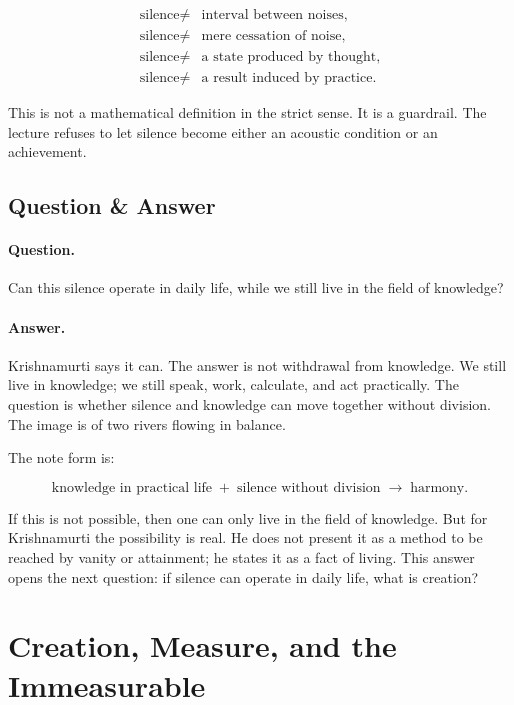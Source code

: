 \begin{align}
\text{silence} \neq{}&
\text{interval between noises}, \\
\text{silence} \neq{}&
\text{mere cessation of noise}, \\
\text{silence} \neq{}&
\text{a state produced by thought}, \\
\text{silence} \neq{}&
\text{a result induced by practice}.
\end{align}

This is not a mathematical definition in the strict sense. It is a guardrail. The lecture refuses to let silence become either an acoustic condition or an achievement.

\subsection{Question \& Answer}

\paragraph{Question.}
Can this silence operate in daily life, while we still live in the field of knowledge?

\paragraph{Answer.}
Krishnamurti says it can. The answer is not withdrawal from knowledge. We still live in knowledge; we still speak, work, calculate, and act practically. The question is whether silence and knowledge can move together without division. The image is of two rivers flowing in balance.

The note form is:

\begin{equation}
\text{knowledge in practical life}
\;+\;
\text{silence without division}
\;\longrightarrow\;
\text{harmony}.
\end{equation}

If this is not possible, then one can only live in the field of knowledge. But for Krishnamurti the possibility is real. He does not present it as a method to be reached by vanity or attainment; he states it as a fact of living. This answer opens the next question: if silence can operate in daily life, what is creation?

\section{Creation, Measure, and the Immeasurable}

